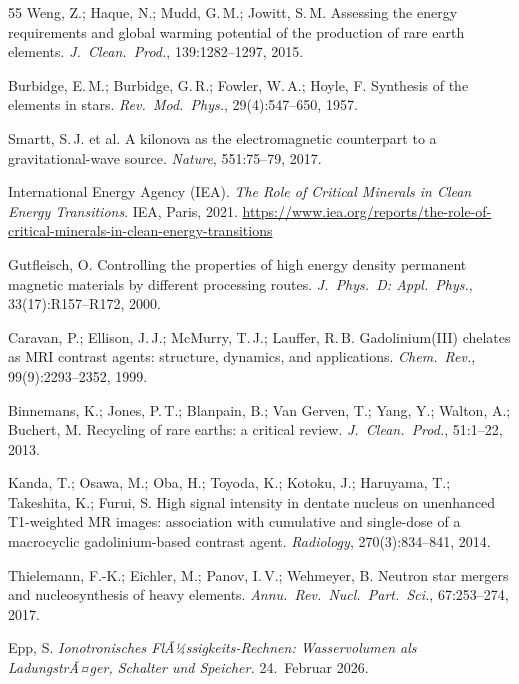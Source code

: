 ﻿\documentclass[12pt, a4paper]{report}
\theoremstyle{definition}
\theoremstyle{remark}
\begin{document}
\begin{thebibliography}{55}
  Weng, Z.; Haque, N.; Mudd, G.\,M.; Jowitt, S.\,M.
  Assessing the energy requirements and global warming potential of the
  production of rare earth elements.
  \textit{J.\ Clean.\ Prod.}, 139:1282--1297, 2015.

  Burbidge, E.\,M.; Burbidge, G.\,R.; Fowler, W.\,A.; Hoyle, F.
  Synthesis of the elements in stars.
  \textit{Rev.\ Mod.\ Phys.}, 29(4):547--650, 1957.

  Smartt, S.\,J. et al.
  A kilonova as the electromagnetic counterpart to a gravitational-wave source.
  \textit{Nature}, 551:75--79, 2017.

  International Energy Agency (IEA).
  \textit{The Role of Critical Minerals in Clean Energy Transitions}.
  IEA, Paris, 2021.
  {\small\url{https://www.iea.org/reports/the-role-of-critical-minerals-in-clean-energy-transitions}}

  Gutfleisch, O.
  Controlling the properties of high energy density permanent magnetic materials
  by different processing routes.
  \textit{J.\ Phys.\ D: Appl.\ Phys.}, 33(17):R157--R172, 2000.

  Caravan, P.; Ellison, J.\,J.; McMurry, T.\,J.; Lauffer, R.\,B.
  Gadolinium(III) chelates as MRI contrast agents: structure, dynamics,
  and applications.
  \textit{Chem.\ Rev.}, 99(9):2293--2352, 1999.

  Binnemans, K.; Jones, P.\,T.; Blanpain, B.; Van Gerven, T.;
  Yang, Y.; Walton, A.; Buchert, M.
  Recycling of rare earths: a critical review.
  \textit{J.\ Clean.\ Prod.}, 51:1--22, 2013.

  Kanda, T.; Osawa, M.; Oba, H.; Toyoda, K.; Kotoku, J.; Haruyama, T.;
  Takeshita, K.; Furui, S.
  High signal intensity in dentate nucleus on unenhanced T1-weighted
  MR images: association with cumulative and single-dose of a
  macrocyclic gadolinium-based contrast agent.
  \textit{Radiology}, 270(3):834--841, 2014.

  Thielemann, F.-K.; Eichler, M.; Panov, I.\,V.; Wehmeyer, B.
  Neutron star mergers and nucleosynthesis of heavy elements.
  \textit{Annu.\ Rev.\ Nucl.\ Part.\ Sci.}, 67:253--274, 2017.

  Epp, S.
  \textit{Ionotronisches FlÃ¼ssigkeits-Rechnen: Wasservolumen als
  LadungstrÃ¤ger, Schalter und Speicher.} 24.~Februar 2026.

\end{thebibliography}

\end{document}
